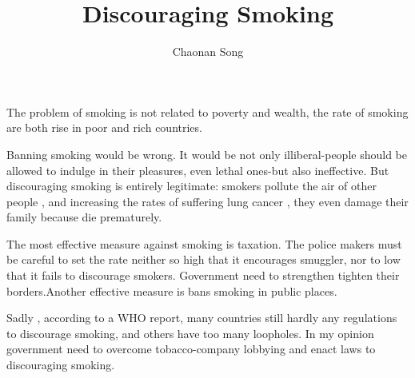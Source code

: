 \documentclass{ctexart}
\begin{document}
\title{Discouraging Smoking}
\author{Chaonan Song}
\maketitle
\par The problem of smoking is not related to poverty and wealth, the rate of smoking are both rise in poor and rich countries.
\par Banning smoking would be wrong. It would be not only illiberal-people should be allowed to indulge in their pleasures, even lethal ones-but also ineffective. But discouraging smoking is entirely legitimate: smokers pollute the air of other people , and increasing the rates of suffering lung cancer , they even damage their family because die prematurely.
\par The most effective measure against smoking is taxation. The police makers must be careful to set the rate neither so high that it encourages smuggler, nor to low that it fails to discourage smokers. Government need to strengthen tighten their borders.Another effective measure is bans smoking in public places.
\par Sadly , according to a WHO report,  many countries still hardly any regulations to discourage smoking, and others have too many loopholes. In my opinion government need to overcome tobacco-company lobbying and enact laws to discouraging smoking.
\end{document}
